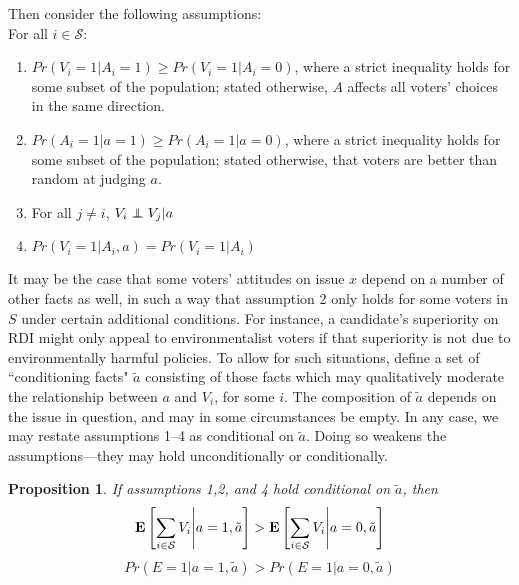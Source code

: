 \documentclass[11pt]{article}
\def\independenT#1#2{\mathrel{\rlap{$#1#2$}\mkern2mu{#1#2}}}
\newcommand\independent{\protect\mathpalette{\protect\independenT}{\perp}}
\newcommand{\E}{\mathop{\bf E\/}}
\newtheorem*{prop*}{Proposition}
\begin{document}
Then consider the following assumptions:\\
For all $i\in\mathcal{S}$:
\begin{enumerate}
\item $Pr(V_i=1|A_i=1)\ge Pr(V_i=1|A_i=0)$, where a strict inequality holds for some subset of the population; stated otherwise, $A$ affects all voters' choices in the same direction.
\item $Pr(A_i=1|a=1)\ge Pr(A_i=1|a=0)$, where a strict inequality holds for some subset of the population; stated otherwise, that voters are better than random at judging $a$.
\item For all $j\ne i$, $V_i \independent V_j|a$
\item $Pr(V_i=1|A_i, a)=Pr(V_i=1|A_i)$
\end{enumerate}

It may be the case that some voters' attitudes on issue $x$ depend on a number of other facts as well,  in such a way that assumption 2 only holds for some voters in $S$ under certain additional conditions.
For instance, a candidate's superiority on RDI might only appeal to environmentalist voters if that superiority is not due to environmentally harmful policies.
To allow for such situations, define a set of ``conditioning facts" $\tilde{a}$ consisting of those facts which may qualitatively moderate the relationship between $a$ and $V_i$, for some $i$.
The composition of $\tilde{a}$ depends on the issue in question, and
may in some circumstances be empty.
In any case, we may restate assumptions 1--4 as conditional on
$\tilde{a}$.
Doing so weakens the assumptions---they may hold unconditionally or
conditionally.

\begin{prop*}
If assumptions 1,2, and 4 hold conditional on $\tilde{a}$, then
\begin{equation}\label{eq:prop1ap}
\E \left[\displaystyle\sum_{i \in \mathcal{S}} V_i \middle| a=1,\tilde{a}\right]>\E \left[\displaystyle\sum_{i \in \mathcal{S}} V_i\middle| a=0,\tilde{a}\right]
\end{equation}
\begin{equation}\label{eq:prop2ap}
Pr(E=1|a=1,\tilde{a})>Pr(E=1|a=0,\tilde{a})
\end{equation}
\end{prop*}
\end{document}
